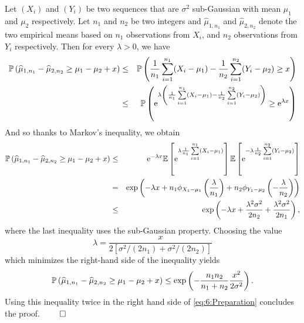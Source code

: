 Let $(X_i)$ and $(Y_i)$ be two \iid{} sequences that are $\sigma^2$ sub-Gaussian with mean $\mu_1$ and $\mu_2$ respectively. Let $n_1$ and $n_2$ be two integers and $\widehat{\mu}_{1,n_1}$ and $\widehat{\mu}_{2,n_2}$ denote the two empirical means based on $n_1$ observations from $X_i$, and $n_2$ observations from $Y_i$ respectively.
Then for every $\lambda > 0$, we have
\begin{eqnarray*}
    \mathbb{P}\left(\widehat{\mu}_{1,n_1} - \widehat{\mu}_{2,n_2} \geq \mu_1 - \mu_2 + x \right)
    & \leq & \mathbb{P}\left(\frac{1}{n_1}\sum_{i=1}^{n_1} (X_i-\mu_1) - \frac{1}{n_2}\sum_{i=1}^{n_2} (Y_i - \mu_2) \geq x \right)\\
    & \leq & \mathbb{P}\left(\mathrm{e}^{\lambda \left(\frac{1}{n_1}\sum\limits_{i=1}^{n_1} (X_i-\mu_1) - \frac{1}{n_2}\sum\limits_{i=1}^{n_2} (Y_i - \mu_2)\right)} \geq \mathrm{e}^{\lambda x} \right)
\end{eqnarray*}
And so thanks to Markov's inequality, we obtain
\begin{eqnarray*}
    \mathbb{P}\left(\widehat{\mu}_{1,n_1} - \widehat{\mu}_{2,n_2} \geq \mu_1 - \mu_2 + x \right)
    & \leq & \mathrm{e}^{-\lambda x}\mathbb{E}\left[\mathrm{e}^{\lambda \frac{1}{n_1}\sum\limits_{i=1}^{n_1} (X_i-\mu_1)}\right]\mathbb{E}\left[\mathrm{e}^{-\lambda \frac{1}{n_2}\sum\limits_{i=1}^{n_2} (Y_i-\mu_2)}\right] \\
    & = & \exp\left(- \lambda x + n_1\phi_{X_1 - \mu_1}\left(\frac{\lambda}{n_1}\right) + n_2\phi_{Y_1 - \mu_2}\left(-\frac{\lambda}{n_2}\right)\right) \\
    & \leq & \exp\left(- \lambda x + \frac{\lambda^2\sigma^2}{2n_2} + \frac{\lambda^2\sigma^2}{2n_1}\right),
\end{eqnarray*}
%
where the last inequality uses the sub-Gaussian property.
%
Choosing the value
\[\lambda = \frac{x}{2\left[\sigma^2/(2n_1) + \sigma^2/(2n_2)\right]}\]
which minimizes the right-hand side of the inequality yields
\[\mathbb{P}\left(\widehat{\mu}_{1,n_1} - \widehat{\mu}_{2,n_2} \geq \mu_1 - \mu_2 + x \right) \leq \exp\left(- \frac{n_1n_2}{n_1+n_2}\frac{x^2}{2\sigma^2}\right).\]
%
Using this inequality twice in the right hand side of \eqref{eq:6:Preparation} concludes the proof.
\hfill{} $\qed$  %



